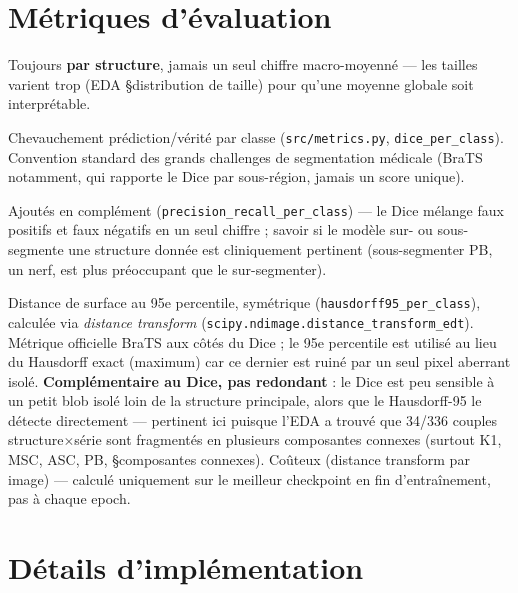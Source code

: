 \section{Métriques d'évaluation}
\label{sec:phase1-metrics}

Toujours \textbf{par structure}, jamais un seul chiffre macro-moyenné --- les tailles
varient trop (EDA \S distribution de taille) pour qu'une moyenne globale soit
interprétable.

\begin{description}[style=nextline]
    \item[Dice] Chevauchement prédiction/vérité par classe (\texttt{src/metrics.py},
        \texttt{dice\_per\_class}). Convention standard des grands challenges de
        segmentation médicale (BraTS notamment, qui rapporte le Dice par sous-région,
        jamais un score unique).
    \item[Précision / Rappel] Ajoutés en complément (\texttt{precision\_recall\_per\_class})
        --- le Dice mélange faux positifs et faux négatifs en un seul chiffre ; savoir
        si le modèle sur- ou sous-segmente une structure donnée est cliniquement
        pertinent (sous-segmenter PB, un nerf, est plus préoccupant que le
        sur-segmenter).
    \item[Hausdorff-95] Distance de surface au 95e percentile, symétrique
        (\texttt{hausdorff95\_per\_class}), calculée via \emph{distance transform}
        (\texttt{scipy.ndimage.distance\_transform\_edt}). Métrique officielle BraTS
        aux côtés du Dice ; le 95e percentile est utilisé au lieu du Hausdorff exact
        (maximum) car ce dernier est ruiné par un seul pixel aberrant isolé.
        \textbf{Complémentaire au Dice, pas redondant} : le Dice est peu sensible à un
        petit blob isolé loin de la structure principale, alors que le Hausdorff-95 le
        détecte directement --- pertinent ici puisque l'EDA a trouvé que 34/336 couples
        structure$\times$série sont fragmentés en plusieurs composantes connexes
        (surtout K1, MSC, ASC, PB, \S composantes connexes).
        Coûteux (distance transform par image) --- calculé uniquement sur le meilleur
        checkpoint en fin d'entraînement, pas à chaque epoch.
\end{description}

\section{Détails d'implémentation}

